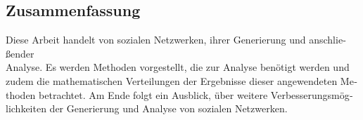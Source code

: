 \begingroup
\let\clearpage\relax
\let\cleardoublepage\relax
\let\cleardoublepage\relax

\begin{otherlanguage}{ngerman}
\chapter*{Zusammenfassung}
Diese Arbeit handelt von sozialen Netzwerken, ihrer Generierung und anschließender \\
Analyse. Es werden Methoden vorgestellt, die zur Analyse benötigt werden und zudem die mathematischen Verteilungen der Ergebnisse dieser angewendeten Methoden betrachtet. Am Ende folgt ein Ausblick, über weitere Verbesserungsmöglichkeiten der Generierung und Analyse von sozialen Netzwerken. 
\end{otherlanguage}

\endgroup
\vfill
